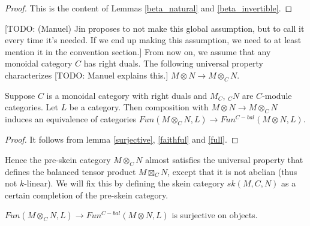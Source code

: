\begin{proof}
  This is the content of Lemmas \ref{beta_natural} and \ref{beta_invertible}.
\end{proof}

[TODO: (Manuel) Jin proposes to not make this global assumption, but to call
it every time it's needed. If we end up making this assumption, we need to at
least mention it in the convention section.] From now on, we assume that any
monoidal category $C$ has right duals. The following universal property
characterizes [TODO: Manuel explains this.] $M\otimes N \to M\otimes_C N$.

\begin{proposition}\label{univ_bal}
  Suppose $C$ is a monoidal category with right duals and $M_C$, $_{C}N$ are
  $C$-module categories. Let $L$ be a category. Then composition with
  $M\otimes N \to M\otimes_C N$ induces an equivalence of categories
  $Fun(M\otimes_C N,L)\to Fun^{C-bal}(M\otimes N,L)$.
\end{proposition}

\begin{proof}
  It follows from lemma \ref{surjective}, \ref{faithful} and \ref{full}.
\end{proof}

\begin{remark}
  Hence the pre-skein category $M \otimes_{C} N$ almost satisfies the
  universal property that defines the balanced tensor product $M \boxtimes_{C}
  N$, except that it is not abelian (thus not $k$-linear). We will fix this by
  defining the skein category $sk(M,C,N)$ as a certain completion of the
  pre-skein category.
\end{remark}

\begin{lemma}\label{surjective}
  $Fun(M\otimes_C N,L)\to Fun^{C-bal}(M\otimes N,L)$ is surjective on
  objects.
\end{lemma}

